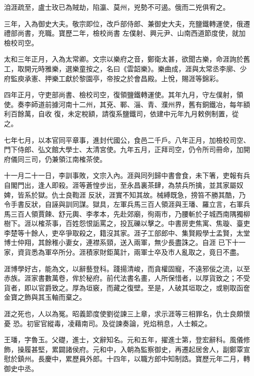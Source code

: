 \begin{pinyinscope}
 洎涯疏至，盧士玫已為賊劫，陷瀛、莫州，兇勢不可遏。俄而二兇俱宥之。



 三年，入為御史大夫。敬宗即位，改戶部侍郎、兼御史大夫，充鹽鐵轉運使，俄遷禮部尚書，充職。寶歷二年，檢校尚書
 左僕射、興元尹、山南西道節度使，就加檢校司空。



 太和三年正月，入為太常卿。文宗以樂府之音，鄭衛太甚，欲聞古樂，命涯詢於舊工，取開元時雅樂，選樂童按之，名曰《雲韶樂》。樂曲成，涯與太常丞李廓、少府監庾承憲、押樂工獻於黎園亭，帝按之於會昌殿。上悅，賜涯等錦彩。



 四年正月，守吏部尚書、檢校司空，復領鹽鐵轉運使。其年九月，守左僕射，領使。奏李師道前據河南十二州，其兗、鄆、淄、青、濮州界，舊有銅鐵冶，每年額利百餘萬，自收
 復，未定稅額，請復系鹽鐵司，依建中元年九月敕例制置，從之。



 七年七月，以本官同平章事，進封代國公，食邑二千戶。八年正月，加檢校司空、門下侍郎、弘文館大學士、太清宮使。九年五月，正拜司空，仍令所司冊命，加開府儀同三司，仍兼領江南榷茶使。



 十一月二十一日，李訓事敗，文宗入內。涯與同列歸中書會食，未下箸，吏報有兵自閣門出，逢人即殺。涯等蒼惶步出，至永昌裏茶肆，為禁兵所擒，並其家屬奴婢，皆系於獄。仇士良鞫涯
 反狀，涯實不知其故。械縛既急，搒笞不勝其酷，乃令手書反狀，自誣與訓同謀。獄具，左軍兵馬三百人領涯與王璠、羅立言，右軍兵馬三百人領賈餗、舒元輿、李孝本，先赴郊廟，徇兩市，乃腰斬於子城西南隅獨柳樹下。涯以榷茶事，百姓怨恨詬罵之，投瓦礫以擊之。中書房吏焦寓、焦璇、臺吏李楚等十餘人，吏卒爭取殺之，籍沒其家。涯子工部郎中、集賢殿學士孟賢，太堂博士仲翔，其餘稚小妻女，連襟系頸，送入兩軍，無少長盡誅之。自涯
 已下十一家，資貨悉為軍卒所分。涯積家財鉅萬計，兩軍士卒及市人亂取之，竟日不盡。



 涯博學好古，能為文，以辭藝登科。踐揚清峻，而貪權固寵，不遠邪佞之流，以至赤族。涯家書數萬卷，侔於秘府。前代法書名畫，人所保惜者，以厚貨致之；不受貨者，即以官爵致之。厚為垣竅，而藏之復壁。至是，人破其垣取之，或剔取函奩金寶之飾與其玉軸而棄之。



 涯之死也，人以為冤。昭義節度使劉從諫三上章，求示涯等三相罪名，仇士良頗懷憂
 恐。初宦官縱毒，凌藉南司。及從諫奏論，兇焰稍息，人士賴之。



 王璠，字魯玉。父礎，進士，文辭知名。元和五年，擢進士第，登宏辭科。風儀修飾，操履甚堅，累闢諸侯府。元和中，入朝為監察御史，再遷起居舍人，副鄭覃宣慰於鎮州。長慶中，累歷員外郎。十四年，以職方郎中知制誥。寶歷元年二月，轉御史中丞。




\end{pinyinscope}
